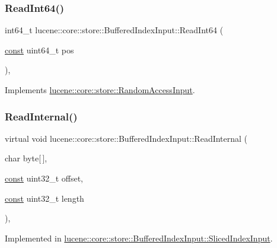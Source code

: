 \subsubsection{\texorpdfstring{Read\+Int64()}{ReadInt64()}\hspace{0.1cm}{\footnotesize\ttfamily [2/2]}}
{\footnotesize\ttfamily int64\+\_\+t lucene\+::core\+::store\+::\+Buffered\+Index\+Input\+::\+Read\+Int64 (\begin{DoxyParamCaption}\item[{\mbox{\hyperlink{ZlibCrc32_8h_a2c212835823e3c54a8ab6d95c652660e}{const}} uint64\+\_\+t}]{pos }\end{DoxyParamCaption})\hspace{0.3cm}{\ttfamily [inline]}, {\ttfamily [virtual]}}



Implements \mbox{\hyperlink{classlucene_1_1core_1_1store_1_1RandomAccessInput_abb5d56744a927492a2dc0cf0bc8407b3}{lucene\+::core\+::store\+::\+Random\+Access\+Input}}.

\mbox{\label{classlucene_1_1core_1_1store_1_1BufferedIndexInput_a1af5051db8ec61ea83c96968fd998543}} 
\subsubsection{\texorpdfstring{Read\+Internal()}{ReadInternal()}}
{\footnotesize\ttfamily virtual void lucene\+::core\+::store\+::\+Buffered\+Index\+Input\+::\+Read\+Internal (\begin{DoxyParamCaption}\item[{char}]{byte\mbox{[}$\,$\mbox{]},  }\item[{\mbox{\hyperlink{ZlibCrc32_8h_a2c212835823e3c54a8ab6d95c652660e}{const}} uint32\+\_\+t}]{offset,  }\item[{\mbox{\hyperlink{ZlibCrc32_8h_a2c212835823e3c54a8ab6d95c652660e}{const}} uint32\+\_\+t}]{length }\end{DoxyParamCaption})\hspace{0.3cm}{\ttfamily [protected]}, {}}



Implemented in \mbox{\hyperlink{classlucene_1_1core_1_1store_1_1BufferedIndexInput_1_1SlicedIndexInput_a0f48d50c8c60eceddd88bbdb29c5eee0}{lucene\+::core\+::store\+::\+Buffered\+Index\+Input\+::\+Sliced\+Index\+Input}}.

